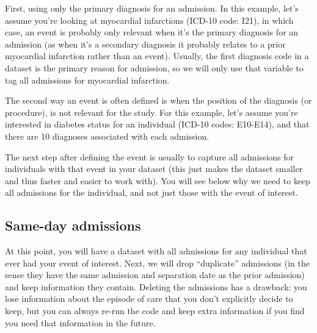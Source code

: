 \documentclass[11pt]{article}
\begin{document}
First, using only the primary diagnosis for an admission. 
In this example, let's assume you're looking at myocardial infarctions (ICD-10 code: I21),
in which case, an event is probably only relevant when it's the primary diagnosis for an admission
(as when it's a secondary diagnosis it probably relates to a prior myocardial infarction
rather than an event). 
Usually, the first diagnosis code in a dataset is the primary reason for admission, so we will only
use that variable to tag all admissions for myocardial infarction. 

\color{Blue4}
\begin{stlog}\end{stlog}
\color{black}

The second way an event is often defined is 
when the position of the diagnosis (or procedure), is not relevant for the study. 
For this example, let's assume you're interested in 
diabetes status for an individual (ICD-10 codes: E10-E14),
and that there are 10 diagnoses associated with each admission. 

\color{Blue4}
\begin{stlog}\end{stlog}
\color{black}

The next step after defining the event
is usually to capture all admissions for individuals
with that event in your dataset (this just makes the dataset
smaller and thus faster and easier to work with). You
will see below why we need to keep all admissions for the individual, and not 
just those with the event of interest. 

\color{Blue4}
\begin{stlog}\end{stlog}
\color{black}
\clearpage
\subsection{Same-day admissions}

At this point, you will have a dataset with all admissions for any individual
that ever had your event of interest. 
Next, we will drop ``duplicate'' admissions (in the sense they have 
the same admission and separation date as the prior admission) 
and keep information they contain. 
Deleting the admissions has a drawback: you lose information
about the episode of care that you don't explicitly decide to keep,
but you can always re-run the code and keep extra information
if you find you need that information in the future. 
\end{document}
